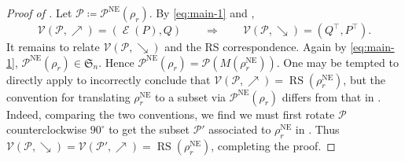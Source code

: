 \documentclass{amsart}
\theoremstyle{definition}
\DeclareMathOperator{\RS}{RS}
\DeclareMathOperator{\NE}{NE}
\DeclareMathOperator{\evacuation}{\mathcal{E}}
\begin{document}
\begin{proof}[Proof of ]
    Let $\mathcal{P} \coloneqq \mathcal{P}^{\NE}(\rho_r)$. By \eqref{eq:main-1} and ,
      \[ \mathcal{V}(\mathcal{P}, \nearrow) = (\evacuation(P), Q)\qquad\Rightarrow\qquad\mathcal{V}(\mathcal{P}, \searrow) = (Q^\top, P^\top). \]
    It remains to relate $\mathcal{V}(\mathcal{P}, \searrow)$ and the RS correspondence. Again by \eqref{eq:main-1}, $\mathcal{P}^{\NE}(\rho_r) \in \mathfrak{S}_n$. Hence $\mathcal{P}^{\NE}(\rho_r) = \mathcal{P}(M(\rho_r^{\NE}))$. One may be tempted to directly apply  to incorrectly conclude that $\mathcal{V}(\mathcal{P}, \nearrow) = \RS(\rho_r^{\NE})$, but the convention for translating $\rho_r^{\NE}$ to a subset via $\mathcal{P}^{\NE}(\rho_r)$ differs from that in . Indeed, comparing the two conventions, we find we must first rotate $\mathcal{P}$ counterclockwise $90^\circ$ to get the subset $\mathcal{P}'$ associated to $\rho_r^{\NE}$ in . Thus $\mathcal{V}(\mathcal{P}, \searrow) = \mathcal{V}(\mathcal{P}', \nearrow) = \RS(\rho_r^{\NE})$, completing the proof.
\end{proof}
\end{document}
